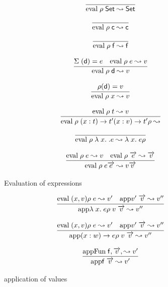 \begin{figure}[p]

\[\begin{array}{c}
	  \infer{\Eval{\rho}{\Set}{\Set}} 
          {} 
\end{array}
\]

\[
\begin{array}{c}
	  \infer{\Eval{\rho}{\cc}{\cc}} 
          {}

\end{array}
\]

\[\begin{array}{c}
	  \infer{\Eval{\rho}{\ff}{\ff}} 
          {} 
\end{array}
\]

\[\begin{array}{c}
	  \infer{\Eval{\rho}{\dd}{v}} 
          {\Lookup{\Sig}{\dd}{e} & \Eval{\rho}{e}{v}} 
\end{array}
\]

\[\begin{array}{c}
	  \infer{\Eval{\rho}{x}{v}} 
          {\Lookup{\rho}{\dd}{v}} 
\end{array}
\]

\[\begin{array}{c}
	  \infer{\Eval{\rho}{\EPi{x}{t}{t'}{\EPi{x}{v}{t'}{\rho}}}}
          {\Eval{\rho}{t}{v}}
\end{array}
\]

\[\begin{array}{c}
	  \infer{\Eval{\rho}{\lam x . e}{\lam{x}{e}{\rho}}}
		{} 
\end{array}
\]


\[
\begin{array}{c}
          
	  \infer{\Eval{\rho}{e \vec{e}}{v \vec{v}}}
          {\Eval{\rho}{e}{v} & \Eval{\rho}{\vec{e}}{\vec{v}}}
\end{array}
\]
\caption{Evaluation of expressions}
\end{figure}

\begin{figure}[p]

\[
\begin{array}{c}
          
	  \infer{\App{\lam{x}{e}{\rho}}{v \; \vec{v}}{v''}}
          {\Eval{(x,v)\rho}{e}{v'} & \App{v'}{\vec{v}}{v''}}
\end{array}
\]

\[
\begin{array}{c}
          
	  \infer{\App{\EPi{x}{w}{e}{\rho}}{v \; \vec{v}}{v''}}
          {\Eval{(x,v)\rho}{e}{v'} & \App{v'}{\vec{v}}{v''}}

\end{array}
\]

\[
\begin{array}{c}
          
	  \infer{\App{\ff}{\vec{v}}{v'}}
          {\AppFun{\ff}{\vec{v}}{v'}}
\end{array}
\]

\caption{application of values}
\end{figure}


